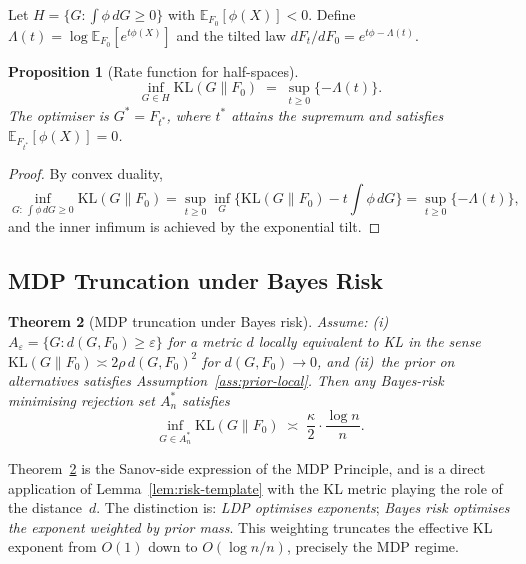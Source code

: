 \documentclass[11pt]{article}
\newcommand{\E}{\mathbb{E}}
\newcommand{\KL}{\mathrm{KL}}
\newcommand{\rhotail}{\rho}  %
\newcommand{\1}{\mathbf{1}}
\theoremstyle{plain}
\newtheorem{theorem}{Theorem}[section]
\newtheorem{proposition}[theorem]{Proposition}
\theoremstyle{definition}
\theoremstyle{remark}
\begin{document}
Let $H=\{G:\int \phi\,dG\ge 0\}$ with $\E_{F_0}[\phi(X)]<0$.
Define $\Lambda(t)=\log\E_{F_0}[e^{t\phi(X)}]$ and the tilted law $dF_t/dF_0 = e^{t\phi-\Lambda(t)}$.

\begin{proposition}[Rate function for half-spaces]\label{prop:half-space-rate}
\begin{equation}\label{eq:half-space-rate}
\inf_{G\in H}\KL(G\|F_0)
\;=\;
\sup_{t\ge 0}\{-\Lambda(t)\}.
\end{equation}
The optimiser is $G^*=F_{t^*}$, where $t^*$ attains the supremum and satisfies $\E_{F_{t^*}}[\phi(X)]=0$.
\end{proposition}

\begin{proof}
By convex duality,
\[
\inf_{G:\,\int \phi\,dG\ge 0}\KL(G\|F_0)
= \sup_{t\ge 0}\inf_G\bigl\{\KL(G\|F_0)-t{\textstyle\int}\phi\,dG\bigr\}
= \sup_{t\ge 0}\{-\Lambda(t)\},
\]
and the inner infimum is achieved by the exponential tilt.
\end{proof}


\subsection{MDP Truncation under Bayes Risk}\label{subsec:mdp-truncation}

\begin{theorem}[MDP truncation under Bayes risk]\label{thm:mdp-truncation}
Assume:
(i)~$A_\varepsilon=\{G:d(G,F_0)\ge \varepsilon\}$ for a metric $d$ locally equivalent to KL in the sense $\KL(G\|F_0)\asymp 2\rhotail\, d(G,F_0)^2$ for $d(G,F_0)\to 0$, and
(ii)~the prior on alternatives satisfies Assumption~\ref{ass:prior-local}.
Then any Bayes-risk minimising rejection set $A_n^*$ satisfies
\begin{equation}\label{eq:mdp-truncation}
\inf_{G\in A_n^*}\KL(G\|F_0)
\;\asymp\;
\frac{\kappa}{2}\cdot\frac{\log n}{n}.
\end{equation}
\end{theorem}

Theorem~\ref{thm:mdp-truncation} is the Sanov-side expression of the MDP Principle, and is a direct application of Lemma~\ref{lem:risk-template} with the KL metric playing the role of the distance~$d$.
The distinction is: \emph{LDP optimises exponents}; \emph{Bayes risk optimises the exponent weighted by prior mass}.
This weighting truncates the effective KL exponent from $O(1)$ down to $O(\log n/n)$, precisely the MDP regime.
\end{document}
